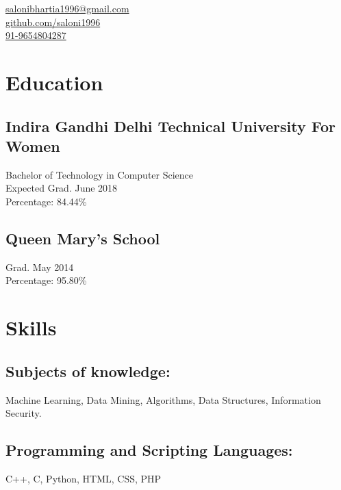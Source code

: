 \documentclass[]{hieudo-build}
\begin{document}
{
	\faEnvelope \href{mailto:salonibhartia1996@gmail.com}{ salonibhartia1996@gmail.com}\\
	\faGithub \href{https://github.com/saloni1996}{ github.com/saloni1996}\\
	\faPhone  \href{}{91-9654804287}
}

\begin{minipage}[t]{0.3\textwidth} 

\section{Education} 

\subsection[Indira Gandhi Delhi Technical University For Women]{Indira Gandhi Delhi Technical University For Women}
Bachelor of Technology in Computer Science \\
Expected Grad. June 2018 \\
Percentage: 84.44\% \\
\sectionsep

\subsection{Queen Mary's School}
Grad. May 2014  
\\ Percentage: 95.80\%
\sectionsep

\section{Skills}
\subsection[Subjects]{Subjects of knowledge:}
Machine Learning, Data Mining, Algorithms, Data Structures, Information Security.

\subsection[Languages]{Programming and Scripting Languages:}
C++, C, Python, HTML, CSS, PHP\\ 


\end{minipage}
\end{document}
